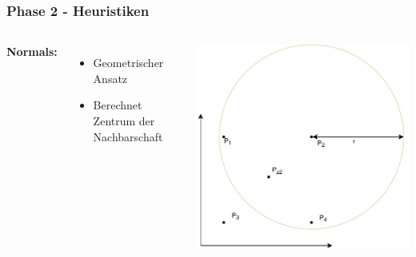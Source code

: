 \documentclass[aspectratio=169]{beamer}
\begin{document}
\begin{frame}
	\frametitle{Phase 2 - Heuristiken}
	\begin{columns}[c] %
		
		\textbf{Normals:}
		\begin{itemize}
			\item Geometrischer Ansatz
			\item Berechnet Zentrum der Nachbarschaft
			
		\end{itemize}
		
		\includegraphics[scale=.7]{normals_centroid.pdf}
		
		
		
	\end{columns}
	\end{frame}
	
\end{document}
